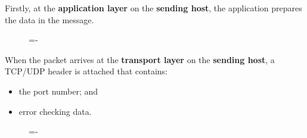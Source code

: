 \documentclass[a4paper]{systems-software}
\begin{document}
Firstly, at the \textbf{application layer} on the \textbf{sending host}, the application prepares the data in the message.

\begin{figure}[H]
	\lineskip=-\fboxrule
\end{figure}

When the packet arrives at the \textbf{transport layer} on the \textbf{sending host}, a TCP/UDP header is attached that contains:
\begin{itemize}
	\item the port number; and
	\item error checking data.
\end{itemize}

\begin{figure}[H]
	\lineskip=-\fboxrule
\end{figure}
\end{document}
